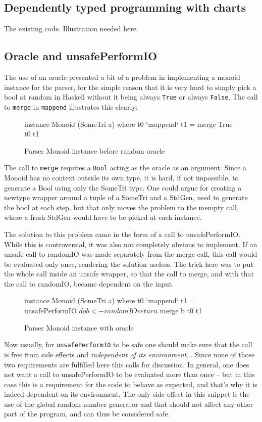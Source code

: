 \documentclass[a4paper,12pt,twosided]{report}
\begin{document}
\subsection{Dependently typed programming with charts}
The existing code. Illustration needed here.

\subsection{Oracle and unsafePerformIO}
The use of an oracle presented a bit of a problem in implementing a monoid
instance for the parser, for the simple reason that it is very hard to simply
pick a bool at random in Haskell without it being always \texttt{True} or always
\texttt{False}. The call to \texttt{merge} in \texttt{mappend} illustrates this
clearly:
\begin{figure}[H]
\begin{code}
instance Monoid (SomeTri a) where
    t0 `mappend` t1 = merge True t0 t1
\end{code}
\caption{Parser Monoid instance before random oracle}
\end{figure}
The call to \texttt{merge} requires a \texttt{Bool} acting as the oracle as an
argument. Since a Monoid has no context outside its own type, it is hard, if not
impossible, to generate a Bool using only the SomeTri type. One could argue for
creating a newtype wrapper around a tuple of a SomeTri and a StdGen, used to
generate the bool at each step, but that only moves the problem to the mempty
call, where a fresh StdGen would have to be picked at each instance.

The solution to this problem came in the form of a call to unsafePerformIO.
While this is controversial, it was also not completely obvious to implement. If
an unsafe call to randomIO was made separately from the merge call, this call
would be evaluated only once, rendering the solution useless. The trick here was
to put the whole call inside an unsafe wrapper, so that the call to merge, and
with that the call to randomIO, became dependent on the input.
\begin{figure}[H]
\begin{code}
instance Monoid (SomeTri a) where
    t0 `mappend` t1 = unsafePerformIO $ do
      b <- randomIO
      return $ merge b t0 t1
\end{code}
\caption{Parser Monoid instance with oracle}
\end{figure}
Now usually, for \texttt{unsafePerformIO} to be safe one should make sure that
the call is free from side effects and \textit{independent of its environment}.
\cite{unsafeHackage}. Since none of those two requirements are fulfilled here
this calls for discussion. In general, one does not want a call to
unsafePerformIO to be evaluated more than once -- but in this case this is a
requirement for the code to behave as expected, and that's why it is indeed
dependent on its environment. The only side effect in this snippet is the use of
the global random number generator and that should not affect any other part of
the program, and can thus be considered safe.
\end{document}
